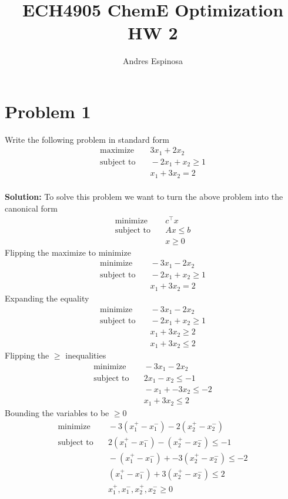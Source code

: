 \documentclass[11pt]{article}
\title{ECH4905 ChemE Optimization HW 2}
\author{Andres Espinosa}
\begin{document}
\maketitle

\section{Problem 1}
Write the following problem in standard form
\begin{align*}
  \text{maximize} & \quad 3 x_1 + 2x_2 \\
  \text{subject to} & \quad -2x_1 + x_2 \geq 1 \\
  & \quad x_1 + 3x_2 = 2
\end{align*}
\\
\textbf{Solution: }
To solve this problem we want to turn the above problem into the canonical form
\begin{align*}
  \text{minimize} & \quad c^\top x \\
  \text{subject to} & \quad Ax \leq b \\
  & \quad x \geq 0
\end{align*}
Flipping the maximize to minimize
\begin{align*}
  \text{minimize} & \quad -3 x_1 - 2x_2 \\
  \text{subject to} & \quad -2x_1 + x_2 \geq 1 \\
  & \quad x_1 + 3x_2 = 2
\end{align*}
Expanding the equality
\begin{align*}
  \text{minimize} & \quad -3 x_1 - 2x_2 \\
  \text{subject to} & \quad -2x_1 + x_2 \geq 1 \\
  & \quad x_1 + 3x_2 \geq 2 \\
  & \quad x_1 + 3x_2 \leq 2
\end{align*}
Flipping the $\geq$ inequalities
\begin{align*}
  \text{minimize} & \quad -3 x_1 - 2x_2 \\
  \text{subject to} & \quad 2x_1 - x_2 \leq -1 \\
  & \quad -x_1 + -3x_2 \leq -2 \\
  & \quad x_1 + 3x_2 \leq 2
\end{align*}
Bounding the variables to be $\geq 0$
\begin{align*}
  \text{minimize} & \quad -3 (x_1^+ - x_1^-) - 2(x_2^+ - x_2^-) \\
  \text{subject to} & \quad 2(x_1^+ - x_1^-) - (x_2^+ - x_2^-) \leq -1 \\
  & \quad -(x_1^+ - x_1^-) + -3(x_2^+ - x_2^-) \leq -2 \\
  & \quad (x_1^+ - x_1^-) + 3(x_2^+ - x_2^-) \leq 2 \\
  & \quad x_1^+, x_1^-, x_2^+, x_2^- \geq 0
\end{align*}
\end{document}
